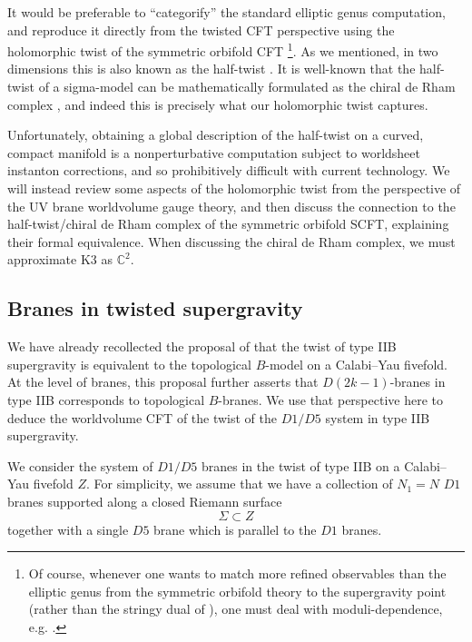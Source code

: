 \documentclass[../main.tex]{subfiles}
\begin{document}
It would be preferable to ``categorify'' the standard elliptic genus computation, and reproduce it directly from the twisted CFT perspective using the holomorphic twist of the symmetric orbifold CFT \footnote{Of course, whenever one wants to match more refined observables than the elliptic genus from the symmetric orbifold theory to the supergravity point (rather than the stringy dual of \cite{Eberhardt:2018ouy}), one must deal with moduli-dependence, e.g. \cite{Taylor:2007hs} .}.  As we mentioned, in two dimensions this is also known as the half-twist \cite{Witten, Kapustin}. It is well-known that the half-twist of a sigma-model can be mathematically formulated as the chiral de Rham complex \cite{Kapustin, Malikovetal, Tan}, and indeed this is precisely what our holomorphic twist captures. 

Unfortunately, obtaining a global description of the half-twist on a curved, compact manifold is a nonperturbative computation subject to worldsheet instanton corrections, and so prohibitively difficult with current technology. We will instead review some aspects of the holomorphic twist from the perspective of the UV brane worldvolume gauge theory, and then discuss the connection to the half-twist/chiral de Rham complex of the symmetric orbifold SCFT, explaining their formal equivalence. When discussing the chiral de Rham complex, we must approximate K3 as $\mathbb{C}^2$.
 

\subsection{Branes in twisted supergravity}

We have already recollected the proposal of \cite{CLsugra} that the twist of type IIB supergravity is equivalent to the topological $B$-model on a Calabi--Yau fivefold.
At the level of branes, this proposal further asserts that $D(2k-1)$-branes in type IIB corresponds to topological $B$-branes.
We use that perspective here to deduce the worldvolume CFT of the twist of the $D1/D5$ system in type IIB supergravity.

We consider the system of $D1/D5$ branes in the twist of type IIB on a Calabi--Yau fivefold $Z$. 
For simplicity, we assume that we have a collection of $N_1 = N$ $D1$ branes supported along a closed Riemann surface
\[\Sigma \subset Z \]
together with a single $D5$ brane which is parallel to the $D1$ branes. 
\end{document}

